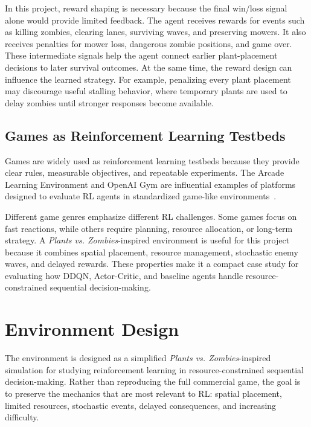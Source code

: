 \documentclass[conference,onecolumn]{IEEEtran}
\begin{document}
In this project, reward shaping is necessary because the final win/loss signal alone would provide limited feedback. The agent receives rewards for events such as killing zombies, clearing lanes, surviving waves, and preserving mowers. It also receives penalties for mower loss, dangerous zombie positions, and game over. These intermediate signals help the agent connect earlier plant-placement decisions to later survival outcomes. At the same time, the reward design can influence the learned strategy. For example, penalizing every plant placement may discourage useful stalling behavior, where temporary plants are used to delay zombies until stronger responses become available.

\subsection{Games as Reinforcement Learning Testbeds}

Games are widely used as reinforcement learning testbeds because they provide clear rules, measurable objectives, and repeatable experiments. The Arcade Learning Environment and OpenAI Gym are influential examples of platforms designed to evaluate RL agents in standardized game-like environments~\cite{bellemare2013arcade,gym_docs}.

Different game genres emphasize different RL challenges. Some games focus on fast reactions, while others require planning, resource allocation, or long-term strategy. A \textit{Plants vs. Zombies}-inspired environment is useful for this project because it combines spatial placement, resource management, stochastic enemy waves, and delayed rewards. These properties make it a compact case study for evaluating how DDQN, Actor-Critic, and baseline agents handle resource-constrained sequential decision-making.


\section{Environment Design}
\label{sec:env_design}

The environment is designed as a simplified \textit{Plants vs. Zombies}-inspired simulation for studying reinforcement learning in resource-constrained sequential decision-making. Rather than reproducing the full commercial game, the goal is to preserve the mechanics that are most relevant to RL: spatial placement, limited resources, stochastic events, delayed consequences, and increasing difficulty.
\end{document}

